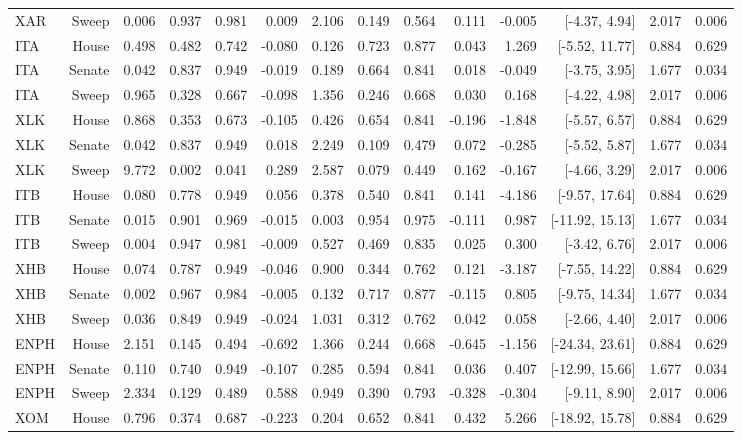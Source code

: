 \begin{table}[htbp]
\begin{tabular}{lrrrrrrrrrrrrr}
XAR & Sweep & 0.006 & 0.937 & 0.981 & 0.009 & 2.106 & 0.149 & 0.564 & 0.111 & -0.005 & [-4.37, 4.94] & 2.017 & 0.006 \\
ITA & House & 0.498 & 0.482 & 0.742 & -0.080 & 0.126 & 0.723 & 0.877 & 0.043 & 1.269 & [-5.52, 11.77] & 0.884 & 0.629 \\
ITA & Senate & 0.042 & 0.837 & 0.949 & -0.019 & 0.189 & 0.664 & 0.841 & 0.018 & -0.049 & [-3.75, 3.95] & 1.677 & 0.034 \\
ITA & Sweep & 0.965 & 0.328 & 0.667 & -0.098 & 1.356 & 0.246 & 0.668 & 0.030 & 0.168 & [-4.22, 4.98] & 2.017 & 0.006 \\
XLK & House & 0.868 & 0.353 & 0.673 & -0.105 & 0.426 & 0.654 & 0.841 & -0.196 & -1.848 & [-5.57, 6.57] & 0.884 & 0.629 \\
XLK & Senate & 0.042 & 0.837 & 0.949 & 0.018 & 2.249 & 0.109 & 0.479 & 0.072 & -0.285 & [-5.52, 5.87] & 1.677 & 0.034 \\
XLK & Sweep & 9.772 & 0.002 & 0.041 & 0.289 & 2.587 & 0.079 & 0.449 & 0.162 & -0.167 & [-4.66, 3.29] & 2.017 & 0.006 \\
ITB & House & 0.080 & 0.778 & 0.949 & 0.056 & 0.378 & 0.540 & 0.841 & 0.141 & -4.186 & [-9.57, 17.64] & 0.884 & 0.629 \\
ITB & Senate & 0.015 & 0.901 & 0.969 & -0.015 & 0.003 & 0.954 & 0.975 & -0.111 & 0.987 & [-11.92, 15.13] & 1.677 & 0.034 \\
ITB & Sweep & 0.004 & 0.947 & 0.981 & -0.009 & 0.527 & 0.469 & 0.835 & 0.025 & 0.300 & [-3.42, 6.76] & 2.017 & 0.006 \\
XHB & House & 0.074 & 0.787 & 0.949 & -0.046 & 0.900 & 0.344 & 0.762 & 0.121 & -3.187 & [-7.55, 14.22] & 0.884 & 0.629 \\
XHB & Senate & 0.002 & 0.967 & 0.984 & -0.005 & 0.132 & 0.717 & 0.877 & -0.115 & 0.805 & [-9.75, 14.34] & 1.677 & 0.034 \\
XHB & Sweep & 0.036 & 0.849 & 0.949 & -0.024 & 1.031 & 0.312 & 0.762 & 0.042 & 0.058 & [-2.66, 4.40] & 2.017 & 0.006 \\
ENPH & House & 2.151 & 0.145 & 0.494 & -0.692 & 1.366 & 0.244 & 0.668 & -0.645 & -1.156 & [-24.34, 23.61] & 0.884 & 0.629 \\
ENPH & Senate & 0.110 & 0.740 & 0.949 & -0.107 & 0.285 & 0.594 & 0.841 & 0.036 & 0.407 & [-12.99, 15.66] & 1.677 & 0.034 \\
ENPH & Sweep & 2.334 & 0.129 & 0.489 & 0.588 & 0.949 & 0.390 & 0.793 & -0.328 & -0.304 & [-9.11, 8.90] & 2.017 & 0.006 \\
XOM & House & 0.796 & 0.374 & 0.687 & -0.223 & 0.204 & 0.652 & 0.841 & 0.432 & 5.266 & [-18.92, 15.78] & 0.884 & 0.629 \\

\end{tabular}
\end{table}
